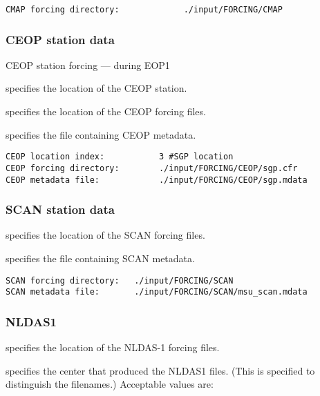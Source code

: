 \begin{Verbatim}[frame=single]
CMAP forcing directory:             ./input/FORCING/CMAP
 \end{Verbatim}

 
 \subsubsection{CEOP station data} \label{sssec:supp_ceop}
 CEOP station forcing --- during EOP1
 

 
  specifies the location of the
 CEOP station.

  specifies the location of the
 CEOP forcing files.

  specifies the file containing
 CEOP metadata.
 

 \begin{Verbatim}[frame=single]
CEOP location index:           3 #SGP location
CEOP forcing directory:        ./input/FORCING/CEOP/sgp.cfr
CEOP metadata file:            ./input/FORCING/CEOP/sgp.mdata
 \end{Verbatim}

 
 \subsubsection{SCAN station data} \label{sssec:supp_scan}
 

 
  specifies the location of the
 SCAN forcing files.

  specifies the file containing
 SCAN metadata.
 

 \begin{Verbatim}[frame=single]
SCAN forcing directory:   ./input/FORCING/SCAN
SCAN metadata file:       ./input/FORCING/SCAN/msu_scan.mdata
 \end{Verbatim}

 
 \subsubsection{NLDAS1} \label{sssec:forcings_nldas1}
 

 
  specifies the location of the
 NLDAS-1 forcing files.

  specifies the center that produced
 the NLDAS1 files. (This is specified to distinguish the filenames.) 
 Acceptable values are:

